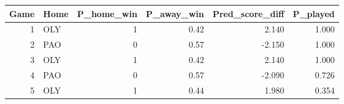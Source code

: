 \begin{table}[ht]
\centering
\begin{tabular}{rlrrrr}
  \hline
Game & Home & P\_home\_win & P\_away\_win & Pred\_score\_diff & P\_played \\ 
  \hline
1 & OLY & 1 & 0.42 & 2.140 & 1.000 \\ 
  2 & PAO & 0 & 0.57 & -2.150 & 1.000 \\ 
  3 & OLY & 1 & 0.42 & 2.140 & 1.000 \\ 
  4 & PAO & 0 & 0.57 & -2.090 & 0.726 \\ 
  5 & OLY & 1 & 0.44 & 1.980 & 0.354 \\ 
   \hline
\end{tabular}
\end{table}
